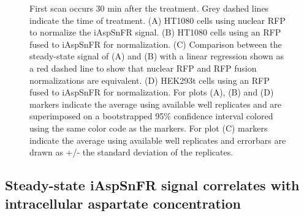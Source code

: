 \documentclass[9pt,lineno]{elife}
\begin{document}
\begin{figure}[ht!]
{First scan occurs 30 min after the treatment.
Grey dashed lines indicate the time of treatment.
(A) HT1080 cells using nuclear RFP to normalize the iAspSnFR signal.
(B) HT1080 cells using an RFP fused to iAspSnFR for normalization.
(C) Comparison between the steady-state signal of (A) and (B) with a linear regression shown as a red dashed line to show that nuclear RFP and RFP fusion normalizations are equivalent.
(D) HEK293t cells using an RFP fused to iAspSnFR for normalization. For plots (A), (B) and (D) markers indicate the average using available well replicates and are superimposed on a bootstrapped 95\% confidence interval colored using the same color code as the markers.
For plot (C) markers indicate the average using available well replicates and errorbars are drawn as +/- the standard deviation of the replicates.
}{}
\end{figure}








\subsection{Steady-state iAspSnFR signal correlates with intracellular aspartate concentration}
\lipsum[7]
\end{document}
